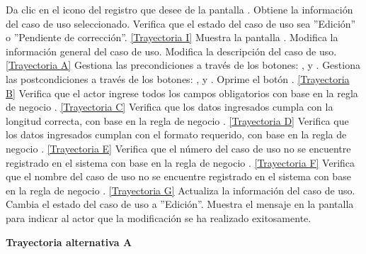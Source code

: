 	\begin{UCtrayectoria}
		\UCpaso[\UCactor] Da clic en el icono \editar del registro que desee de la pantalla .
		\UCpaso[\UCsist] Obtiene la información del caso de uso seleccionado.
		\UCpaso[\UCsist] Verifica que el estado del caso de uso sea ''Edición'' o ''Pendiente de corrección''. \hyperlink{CU12-2:TAI}{[Trayectoria I]}
		\UCpaso[\UCsist] Muestra la pantalla .\label{CU12.2-P4}
		\UCpaso[\UCactor] Modifica la información general del caso de uso. \label{CU12.2-P5}
		\UCpaso[\UCactor] Modifica la descripción del caso de uso. \label{CU12.2-P6} \hyperlink{CU12-2:TAA}{[Trayectoria A]}
		\UCpaso[\UCactor]  Gestiona las precondiciones a través de los botones: , \editar y \eliminar. \label{CU12.2-P7}
		\UCpaso[\UCactor] Gestiona las postcondiciones a través de los botones: , \editar y \eliminar. \label{CU12.2-P8}
		\UCpaso[\UCactor] Oprime el botón . \label{CU12.2-P9} \hyperlink{CU12-2:TAB}{[Trayectoria B]}
		\UCpaso[\UCsist] Verifica que el actor ingrese todos los campos obligatorios con base en la regla de negocio . \hyperlink{CU12-2:TAC}{[Trayectoria C]}
		\UCpaso[\UCsist] Verifica que los datos ingresados cumpla con la longitud correcta, con base en la regla de negocio . \hyperlink{CU12-2:TAD}{[Trayectoria D]}
		\UCpaso[\UCsist] Verifica que los datos ingresados cumplan con el formato requerido, con base en la regla de negocio . \hyperlink{CU12-2:TAE}{[Trayectoria E]}
		\UCpaso[\UCsist] Verifica que el número del caso de uso no se encuentre registrado en el sistema con base en la regla de negocio . \hyperlink{CU12-2:TAF}{[Trayectoria F]}
		\UCpaso[\UCsist] Verifica que el nombre del caso de uso no se encuentre registrado en el sistema con base en la regla de negocio . \hyperlink{CU12-2:TAG}{[Trayectoria G]}
		\UCpaso[\UCsist] Actualiza la información del caso de uso.
		\UCpaso[\UCsist] Cambia el estado del caso de uso a ''Edición''.
		\UCpaso[\UCsist] Muestra el mensaje  en la pantalla  para indicar al actor que la modificación se ha realizado exitosamente.
	\end{UCtrayectoria}		
\hypertarget{CU12-2:TAA}{\textbf{Trayectoria alternativa A}}\\
